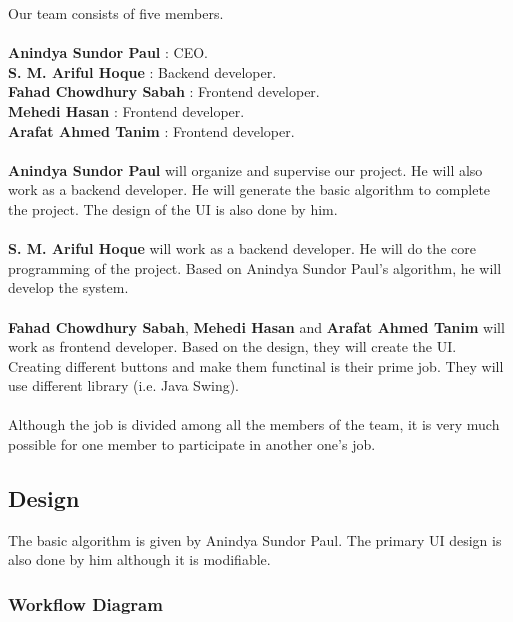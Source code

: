 \documentclass{article}
\begin{document}
Our team consists of five members.\\ \\
\textbf{Anindya Sundor Paul} : CEO.\\
\textbf{S. M. Ariful Hoque} : Backend developer.\\
\textbf{Fahad Chowdhury Sabah} : Frontend developer.\\
\textbf{Mehedi Hasan} : Frontend developer.\\
\textbf{Arafat Ahmed Tanim} : Frontend developer.\\ \\
\textbf{Anindya Sundor Paul} will organize and supervise our project. He will also work as a backend developer. He will generate the basic algorithm to complete the project. The design of the UI is also done by him.\\ \\
\textbf{S. M. Ariful Hoque} will work as a backend developer. He will do the core programming of the project. Based on Anindya Sundor Paul's algorithm, he will develop the system.\\ \\
\textbf{Fahad Chowdhury Sabah}, \textbf{Mehedi Hasan} and \textbf{Arafat Ahmed Tanim} will work as frontend developer. Based on the design, they will create the UI. Creating different buttons and make them functinal is their prime job. They will use different library (i.e. Java Swing).\\ \\
Although the job is divided among all the members of the team, it is very much possible for one member to participate in another one's job.

\subsection{Design} The basic algorithm is given by Anindya Sundor Paul. The primary UI design is also done by him although it is modifiable. 

\subsubsection{Workflow Diagram}
\end{document}
